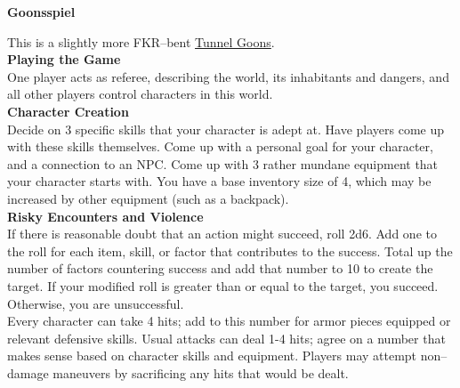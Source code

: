 \documentclass{minimal}
\begin{document}
{\Large \textbf{Goonsspiel}}

\begin{multicols}{2}
  This is a slightly more FKR--bent \href{https://tunnelgoons.com}{Tunnel Goons}. \\

  {\large \textbf{Playing the Game}} \\
  One player acts as referee, describing the world, its inhabitants and dangers, and all other players control characters in this world. \\

  {\large \textbf{Character Creation}} \\

  Decide on 3 specific skills that your character is adept at.
  Have players come up with these skills themselves.
  Come up with a personal goal for your character, and a connection to an NPC.
  Come up with 3 rather mundane equipment that your character starts with.
  You have a base inventory size of 4, which may be increased by other equipment (such as a backpack). \\

  {\large \textbf{Risky Encounters and Violence}} \\

  If there is reasonable doubt that an action might succeed, roll 2d6.
  Add one to the roll for each item, skill, or factor that contributes to the success.
  Total up the number of factors countering success and add that number to 10 to create the target.
  If your modified roll is greater than or equal to the target, you succeed.
  Otherwise, you are unsuccessful. \\

  Every character can take 4 hits; add to this number for armor pieces equipped or relevant defensive skills.
  Usual attacks can deal 1-4 hits; agree on a number that makes sense based on character skills and equipment.
  Players may attempt non--damage maneuvers by sacrificing any hits that would be dealt. \\
  




\end{multicols}
\end{document}
